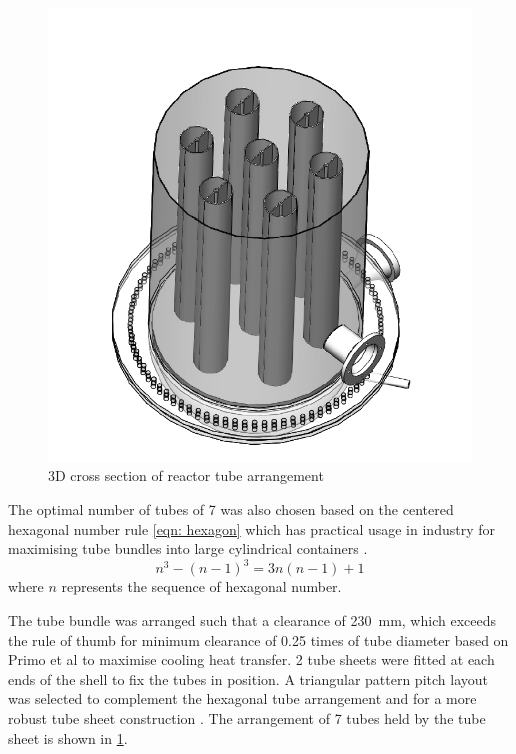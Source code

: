 \begin{figure}
    \centering
    \includegraphics[width=\linewidth]{chapters/2-reaction/figures/FYD reactor 7 tubes cross section 3D.PNG}
    \caption{3D cross section of reactor tube arrangement}
    \label{fig:reactortubearrangement}
\end{figure}
The optimal number of tubes of 7 was also chosen based on the centered hexagonal number rule \cref{eqn: hexagon} which has practical usage in industry for maximising tube bundles into large cylindrical containers \cite{noauthor_realiable_2018}. 
\begin{equation}
    n^3 - (n-1)^3 = 3n(n-1)+1
    \label{eqn: hexagon}
\end{equation}
where $n$ represents the sequence of hexagonal number. 

The tube bundle was arranged such that a clearance of \SI{230}{\milli \metre}, which exceeds the rule of thumb for minimum clearance of 0.25 times of tube diameter based on Primo et al \cite{primo_shell_2012} to maximise cooling heat transfer. 2 tube sheets were fitted at each ends of the shell to fix the tubes in position. A triangular pattern pitch layout was selected to complement the hexagonal tube arrangement and for a more robust tube sheet construction \cite{primo_shell_2012}.  The arrangement of 7 tubes held by the tube sheet is shown in \cref{fig:reactortubearrangement}.

